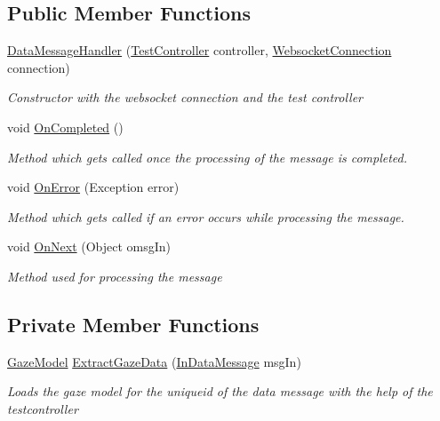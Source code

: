 \subsection*{Public Member Functions}
\begin{DoxyCompactItemize}
\item 
\hyperlink{class_web_analyzer_1_1_server_1_1_message_handler_1_1_data_message_handler_a5fe3823e540e3dbecaf9899d81ce8074}{Data\+Message\+Handler} (\hyperlink{class_web_analyzer_1_1_controller_1_1_test_controller}{Test\+Controller} controller, \hyperlink{class_web_analyzer_1_1_server_1_1_websocket_connection}{Websocket\+Connection} connection)
\begin{DoxyCompactList}\small\item\em Constructor with the websocket connection and the test controller \end{DoxyCompactList}\item 
void \hyperlink{class_web_analyzer_1_1_server_1_1_message_handler_1_1_data_message_handler_a6604e45715842b5c95ec421de45cf2cc}{On\+Completed} ()
\begin{DoxyCompactList}\small\item\em Method which gets called once the processing of the message is completed. \end{DoxyCompactList}\item 
void \hyperlink{class_web_analyzer_1_1_server_1_1_message_handler_1_1_data_message_handler_aa93b7e36208ccfd2253985652accc2c9}{On\+Error} (Exception error)
\begin{DoxyCompactList}\small\item\em Method which gets called if an error occurs while processing the message. \end{DoxyCompactList}\item 
void \hyperlink{class_web_analyzer_1_1_server_1_1_message_handler_1_1_data_message_handler_a30be217815bd3c9f1bd1550ec72be01d}{On\+Next} (Object omsg\+In)
\begin{DoxyCompactList}\small\item\em Method used for processing the message \end{DoxyCompactList}\end{DoxyCompactItemize}
\subsection*{Private Member Functions}
\begin{DoxyCompactItemize}
\item 
\hyperlink{class_web_analyzer_1_1_models_1_1_data_model_1_1_gaze_model}{Gaze\+Model} \hyperlink{class_web_analyzer_1_1_server_1_1_message_handler_1_1_data_message_handler_a374dcd61092a8d072dac4a806d4148ad}{Extract\+Gaze\+Data} (\hyperlink{class_web_analyzer_1_1_models_1_1_message_model_1_1_in_data_message}{In\+Data\+Message} msg\+In)
\begin{DoxyCompactList}\small\item\em Loads the gaze model for the uniqueid of the data message with the help of the testcontroller \end{DoxyCompactList}\end{DoxyCompactItemize}
